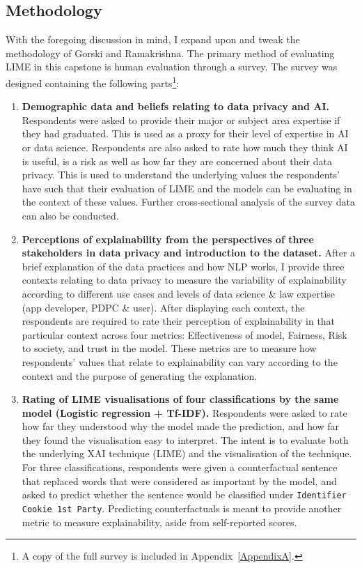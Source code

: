 \subsection{Methodology}
With the foregoing discussion in mind, I expand upon and tweak the methodology of Gorski and Ramakrishna. The primary method of evaluating LIME in this capstone is human evaluation through a survey. The survey was designed containing the following parts\footnote{A copy of the full survey is included in Appendix~\ref{AppendixA}.}:
\begin{enumerate}
	\item \textbf{Demographic data and beliefs relating to data privacy and AI.} Respondents were asked to provide their major or subject area expertise if they had graduated. This is used as a proxy for their level of expertise in AI or data science. Respondents are also asked to rate how much they think AI is useful, is a risk as well as how far they are concerned about their data privacy. This is used to understand the underlying values the respondents' have such that their evaluation of LIME and the models can be evaluating in the context of these values. Further cross-sectional analysis of the survey data can also be conducted.
	\item \textbf{Perceptions of explainability from the perspectives of three stakeholders in data privacy and introduction to the dataset.} After a brief explanation of the data practices and how NLP works, I provide three contexts relating to data privacy to measure the variability of explainability according to different use cases and levels of data science \& law expertise (app developer, PDPC \& user). After displaying each context, the respondents are required to rate their perception of explainability in that particular context across four metrics: Effectiveness of model, Fairness, Risk to society, and trust in the model. These metrics are to measure how respondents' values that relate to explainability can vary according to the context and the purpose of generating the explanation.
	\item \textbf{Rating of LIME visualisations of four classifications by the same model (Logistic regression + Tf-IDF).} Respondents were asked to rate how far they understood why the model made the prediction, and how far they found the visualisation easy to interpret. The intent is to evaluate both the underlying XAI technique (LIME) and the visualisation of the technique. For three classifications, respondents were given a counterfactual sentence that replaced words that were considered as important by the model, and asked to predict whether the sentence would be classified under \texttt{Identifier Cookie 1st Party}. Predicting counterfactuals is meant to provide another metric to measure explainability, aside from self-reported scores.

\end{enumerate}
